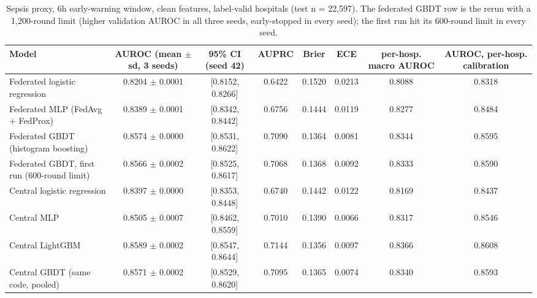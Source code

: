 \begin{table}[t]
\centering\small
\caption{Sepsis proxy, 6h early-warning window, clean features, label-valid hospitals (test n = 22,597). The federated GBDT row is the rerun with a 1,200-round limit (higher validation AUROC in all three seeds, early-stopped in every seed); the first run hit its 600-round limit in every seed.}\label{tab:sep6}
\begin{tabular}{lccccccc}
\toprule
Model & AUROC (mean $\pm$ sd, 3 seeds) & 95\% CI (seed 42) & AUPRC & Brier & ECE & per-hosp. macro AUROC & AUROC, per-hosp. calibration \\
\midrule
Federated logistic regression & 0.8204 $\pm$ 0.0001 & [0.8152, 0.8266] & 0.6422 & 0.1520 & 0.0213 & 0.8088 & 0.8318 \\
Federated MLP (FedAvg + FedProx) & 0.8389 $\pm$ 0.0001 & [0.8342, 0.8442] & 0.6756 & 0.1444 & 0.0119 & 0.8277 & 0.8484 \\
Federated GBDT (histogram boosting) & 0.8574 $\pm$ 0.0000 & [0.8531, 0.8622] & 0.7090 & 0.1364 & 0.0081 & 0.8344 & 0.8595 \\
Federated GBDT, first run (600-round limit) & 0.8566 $\pm$ 0.0002 & [0.8525, 0.8617] & 0.7068 & 0.1368 & 0.0092 & 0.8333 & 0.8590 \\
Central logistic regression & 0.8397 $\pm$ 0.0000 & [0.8353, 0.8448] & 0.6740 & 0.1442 & 0.0122 & 0.8169 & 0.8437 \\
Central MLP & 0.8505 $\pm$ 0.0007 & [0.8462, 0.8559] & 0.7010 & 0.1390 & 0.0066 & 0.8317 & 0.8546 \\
Central LightGBM & 0.8589 $\pm$ 0.0002 & [0.8547, 0.8644] & 0.7144 & 0.1356 & 0.0097 & 0.8366 & 0.8608 \\
Central GBDT (same code, pooled) & 0.8571 $\pm$ 0.0002 & [0.8529, 0.8620] & 0.7095 & 0.1365 & 0.0074 & 0.8340 & 0.8593 \\
\bottomrule
\end{tabular}
\end{table}

